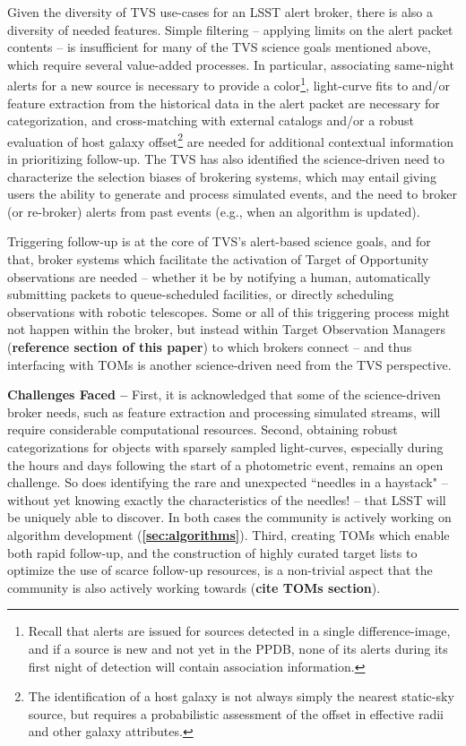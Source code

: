 Given the diversity of TVS use-cases for an LSST alert broker, there is also a diversity of needed features. Simple filtering -- applying limits on the alert packet contents -- is insufficient for many of the TVS science goals mentioned above, which require several value-added processes. In particular, associating same-night alerts for a new source is necessary to provide a color\footnote{Recall that alerts are issued for sources detected in a single difference-image, and if a source is new and not yet in the PPDB, none of its alerts during its first night of detection will contain association information.}, light-curve fits to and/or feature extraction from the historical data in the alert packet are necessary for categorization, and cross-matching with external catalogs and/or a robust evaluation of host galaxy offset\footnote{The identification of a host galaxy is not always simply the nearest static-sky source, but requires a probabilistic assessment of the offset in effective radii and other galaxy attributes.} are needed for additional contextual information in prioritizing follow-up. The TVS has also identified the science-driven need to characterize the selection biases of brokering systems, which may entail giving users the ability to generate and process simulated events, and the need to broker (or re-broker) alerts from past events (e.g., when an algorithm is updated). 

Triggering follow-up is at the core of TVS's alert-based science goals, and for that, broker systems which facilitate the activation of Target of Opportunity observations are needed -- whether it be by notifying a human, automatically submitting packets to queue-scheduled facilities, or directly scheduling observations with robotic telescopes. Some or all of this triggering process might not happen within the broker, but instead within Target Observation Managers ({\bf reference section of this paper}) to which brokers connect -- and thus interfacing with TOMs is another science-driven need from the TVS perspective.

{\bf Challenges Faced --} First, it is acknowledged that some of the science-driven broker needs, such as feature extraction and processing simulated streams, will require considerable computational resources. Second, obtaining robust categorizations for objects with sparsely sampled light-curves, especially during the hours and days following the start of a photometric event, remains an open challenge. So does identifying the rare and unexpected ``needles in a haystack" -- without yet knowing exactly the characteristics of the needles! -- that LSST will be uniquely able to discover. In both cases the community is actively working on algorithm development ({\bf \ref{sec:algorithms}}). Third, creating TOMs which enable both rapid follow-up, and the construction of highly curated target lists to optimize the use of scarce follow-up resources, is a non-trivial aspect that the community is also actively working towards ({\bf cite TOMs section}).

